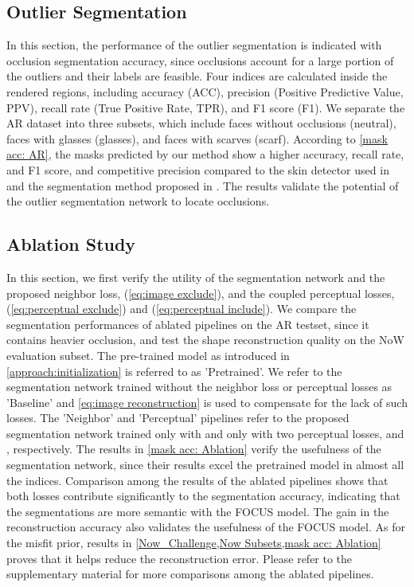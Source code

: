 \documentclass[10pt,twocolumn,letterpaper]{article}
\begin{document}
  

  \subsection{Outlier Segmentation}
  In this section, the performance of the outlier segmentation is indicated with occlusion segmentation accuracy, since occlusions account for a large portion of the outliers and their labels are feasible. Four indices are calculated inside the rendered regions, including accuracy (ACC), precision (Positive Predictive Value, PPV), recall rate (True Positive Rate, TPR), and F1 score (F1).
We separate the AR dataset into three subsets, which include faces without occlusions (neutral), faces with glasses (glasses), and faces with scarves (scarf).
According to \cref{mask acc: AR}, the masks predicted by our method show a higher accuracy, recall rate, and F1 score, and competitive precision compared to the skin detector used in \cite{deng2019accurate} and the segmentation method proposed in \cite{egger2018occlusion}. The results validate the potential of the outlier segmentation network to locate occlusions.




\subsection{Ablation Study}
\label{ablation study}

In this section, we first verify the utility of the segmentation network and the proposed neighbor loss,  (\cref{eq:image exclude}), and the coupled perceptual losses,   (\cref{eq:perceptual exclude}) and  (\cref{eq:perceptual include}). We compare the segmentation performances of ablated pipelines on the AR testset, since it contains heavier occlusion, and test the shape reconstruction quality on the NoW evaluation subset. The pre-trained model as introduced in \cref{approach:initialization} is referred to as 'Pretrained'. We refer to the segmentation network trained without the neighbor loss or perceptual losses as 'Baseline' and \cref{eq:image reconstruction} is used to compensate for the lack of such losses. The 'Neighbor' and 'Perceptual' pipelines refer to the proposed segmentation network trained only with  and only with two perceptual losses,  and , respectively.
The results in \cref{mask acc: Ablation} verify the usefulness of the segmentation network, since their results excel the pretrained model in almost all the indices. Comparison among the results of the ablated pipelines shows that both losses contribute significantly to the segmentation accuracy, indicating that the segmentations are more semantic with the FOCUS model. The gain in the reconstruction accuracy also validates the usefulness of the FOCUS model.
As for the misfit prior, results in \cref{Now_Challenge,Now Subsets,mask acc: Ablation} proves that it helps reduce the reconstruction error.
Please refer to the supplementary material for more comparisons among the ablated pipelines.
\end{document}
